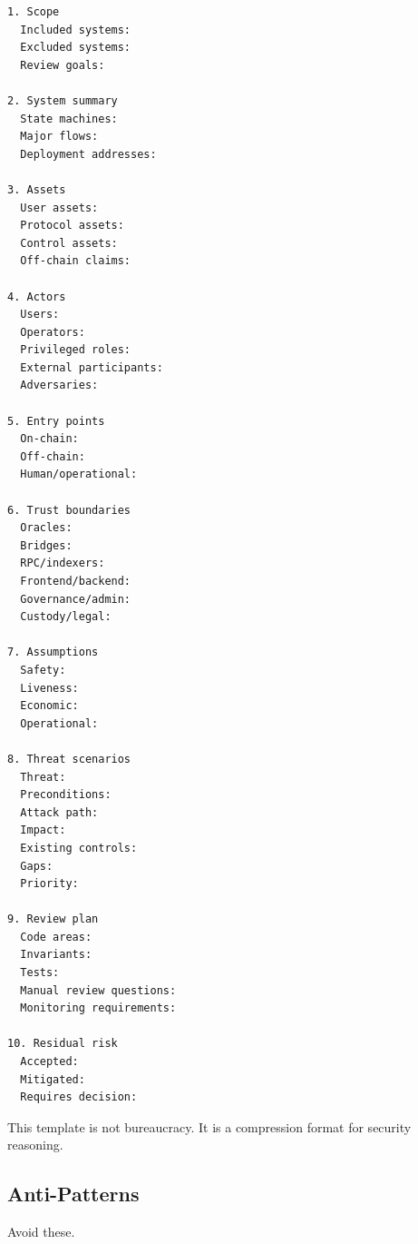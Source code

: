\begin{lstlisting}
1. Scope
  Included systems:
  Excluded systems:
  Review goals:

2. System summary
  State machines:
  Major flows:
  Deployment addresses:

3. Assets
  User assets:
  Protocol assets:
  Control assets:
  Off-chain claims:

4. Actors
  Users:
  Operators:
  Privileged roles:
  External participants:
  Adversaries:

5. Entry points
  On-chain:
  Off-chain:
  Human/operational:

6. Trust boundaries
  Oracles:
  Bridges:
  RPC/indexers:
  Frontend/backend:
  Governance/admin:
  Custody/legal:

7. Assumptions
  Safety:
  Liveness:
  Economic:
  Operational:

8. Threat scenarios
  Threat:
  Preconditions:
  Attack path:
  Impact:
  Existing controls:
  Gaps:
  Priority:

9. Review plan
  Code areas:
  Invariants:
  Tests:
  Manual review questions:
  Monitoring requirements:

10. Residual risk
  Accepted:
  Mitigated:
  Requires decision:
\end{lstlisting}

This template is not bureaucracy. It is a compression format for
security reasoning.

\subsection{Anti-Patterns}

Avoid these.

